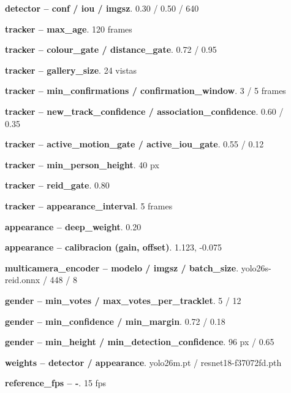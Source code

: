 \documentclass[12pt,letterpaper]{article}
\begin{document}
\begin{description}

\item[] \textbf{detector -- conf / iou / imgsz}. 0.30 / 0.50 / 640

\item[] \textbf{tracker -- max\_age}. 120 frames

\item[] \textbf{tracker -- colour\_gate / distance\_gate}. 0.72 / 0.95

\item[] \textbf{tracker -- gallery\_size}. 24 vistas

\item[] \textbf{tracker -- min\_confirmations / confirmation\_window}. 3 / 5 frames

\item[] \textbf{tracker -- new\_track\_confidence / association\_confidence}. 0.60 / 0.35

\item[] \textbf{tracker -- active\_motion\_gate / active\_iou\_gate}. 0.55 / 0.12

\item[] \textbf{tracker -- min\_person\_height}. 40 px

\item[] \textbf{tracker -- reid\_gate}. 0.80

\item[] \textbf{tracker -- appearance\_interval}. 5 frames

\item[] \textbf{appearance -- deep\_weight}. 0.20

\item[] \textbf{appearance -- calibracion (gain, offset)}. 1.123, -0.075

\item[] \textbf{multicamera\_encoder -- modelo / imgsz / batch\_size}. yolo26s-reid.onnx / 448 / 8

\item[] \textbf{gender -- min\_votes / max\_votes\_per\_tracklet}. 5 / 12

\item[] \textbf{gender -- min\_confidence / min\_margin}. 0.72 / 0.18

\item[] \textbf{gender -- min\_height / min\_detection\_confidence}. 96 px / 0.65

\item[] \textbf{weights -- detector / appearance}. yolo26m.pt / resnet18-f37072fd.pth

\item[] \textbf{reference\_fps -- -}. 15 fps

\end{description}
\end{document}
